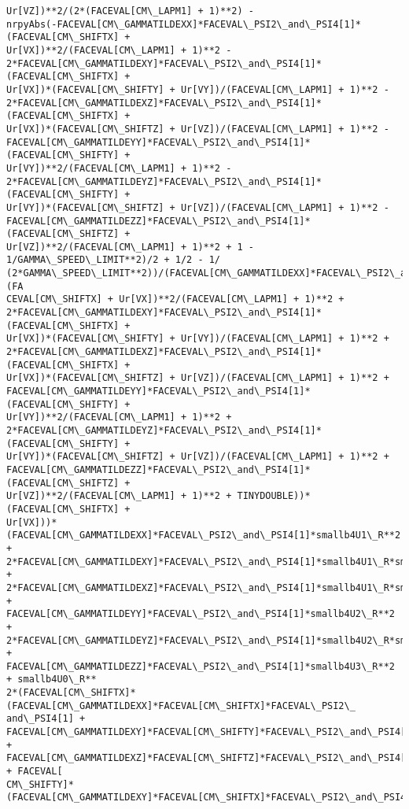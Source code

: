 \documentclass[landscape,letterpaper,10pt,english]{article}
\begin{document}
\begin{Verbatim}[commandchars=\\\{\}]
Ur[VZ])**2/(2*(FACEVAL[CM\_LAPM1] + 1)**2) -
nrpyAbs(-FACEVAL[CM\_GAMMATILDEXX]*FACEVAL\_PSI2\_and\_PSI4[1]*(FACEVAL[CM\_SHIFTX] +
Ur[VX])**2/(FACEVAL[CM\_LAPM1] + 1)**2 -
2*FACEVAL[CM\_GAMMATILDEXY]*FACEVAL\_PSI2\_and\_PSI4[1]*(FACEVAL[CM\_SHIFTX] +
Ur[VX])*(FACEVAL[CM\_SHIFTY] + Ur[VY])/(FACEVAL[CM\_LAPM1] + 1)**2 -
2*FACEVAL[CM\_GAMMATILDEXZ]*FACEVAL\_PSI2\_and\_PSI4[1]*(FACEVAL[CM\_SHIFTX] +
Ur[VX])*(FACEVAL[CM\_SHIFTZ] + Ur[VZ])/(FACEVAL[CM\_LAPM1] + 1)**2 -
FACEVAL[CM\_GAMMATILDEYY]*FACEVAL\_PSI2\_and\_PSI4[1]*(FACEVAL[CM\_SHIFTY] +
Ur[VY])**2/(FACEVAL[CM\_LAPM1] + 1)**2 -
2*FACEVAL[CM\_GAMMATILDEYZ]*FACEVAL\_PSI2\_and\_PSI4[1]*(FACEVAL[CM\_SHIFTY] +
Ur[VY])*(FACEVAL[CM\_SHIFTZ] + Ur[VZ])/(FACEVAL[CM\_LAPM1] + 1)**2 -
FACEVAL[CM\_GAMMATILDEZZ]*FACEVAL\_PSI2\_and\_PSI4[1]*(FACEVAL[CM\_SHIFTZ] +
Ur[VZ])**2/(FACEVAL[CM\_LAPM1] + 1)**2 + 1 - 1/GAMMA\_SPEED\_LIMIT**2)/2 + 1/2 - 1/
(2*GAMMA\_SPEED\_LIMIT**2))/(FACEVAL[CM\_GAMMATILDEXX]*FACEVAL\_PSI2\_and\_PSI4[1]*(FA
CEVAL[CM\_SHIFTX] + Ur[VX])**2/(FACEVAL[CM\_LAPM1] + 1)**2 +
2*FACEVAL[CM\_GAMMATILDEXY]*FACEVAL\_PSI2\_and\_PSI4[1]*(FACEVAL[CM\_SHIFTX] +
Ur[VX])*(FACEVAL[CM\_SHIFTY] + Ur[VY])/(FACEVAL[CM\_LAPM1] + 1)**2 +
2*FACEVAL[CM\_GAMMATILDEXZ]*FACEVAL\_PSI2\_and\_PSI4[1]*(FACEVAL[CM\_SHIFTX] +
Ur[VX])*(FACEVAL[CM\_SHIFTZ] + Ur[VZ])/(FACEVAL[CM\_LAPM1] + 1)**2 +
FACEVAL[CM\_GAMMATILDEYY]*FACEVAL\_PSI2\_and\_PSI4[1]*(FACEVAL[CM\_SHIFTY] +
Ur[VY])**2/(FACEVAL[CM\_LAPM1] + 1)**2 +
2*FACEVAL[CM\_GAMMATILDEYZ]*FACEVAL\_PSI2\_and\_PSI4[1]*(FACEVAL[CM\_SHIFTY] +
Ur[VY])*(FACEVAL[CM\_SHIFTZ] + Ur[VZ])/(FACEVAL[CM\_LAPM1] + 1)**2 +
FACEVAL[CM\_GAMMATILDEZZ]*FACEVAL\_PSI2\_and\_PSI4[1]*(FACEVAL[CM\_SHIFTZ] +
Ur[VZ])**2/(FACEVAL[CM\_LAPM1] + 1)**2 + TINYDOUBLE))*(FACEVAL[CM\_SHIFTX] +
Ur[VX]))*(FACEVAL[CM\_GAMMATILDEXX]*FACEVAL\_PSI2\_and\_PSI4[1]*smallb4U1\_R**2 +
2*FACEVAL[CM\_GAMMATILDEXY]*FACEVAL\_PSI2\_and\_PSI4[1]*smallb4U1\_R*smallb4U2\_R +
2*FACEVAL[CM\_GAMMATILDEXZ]*FACEVAL\_PSI2\_and\_PSI4[1]*smallb4U1\_R*smallb4U3\_R +
FACEVAL[CM\_GAMMATILDEYY]*FACEVAL\_PSI2\_and\_PSI4[1]*smallb4U2\_R**2 +
2*FACEVAL[CM\_GAMMATILDEYZ]*FACEVAL\_PSI2\_and\_PSI4[1]*smallb4U2\_R*smallb4U3\_R +
FACEVAL[CM\_GAMMATILDEZZ]*FACEVAL\_PSI2\_and\_PSI4[1]*smallb4U3\_R**2 + smallb4U0\_R**
2*(FACEVAL[CM\_SHIFTX]*(FACEVAL[CM\_GAMMATILDEXX]*FACEVAL[CM\_SHIFTX]*FACEVAL\_PSI2\_
and\_PSI4[1] +
FACEVAL[CM\_GAMMATILDEXY]*FACEVAL[CM\_SHIFTY]*FACEVAL\_PSI2\_and\_PSI4[1] +
FACEVAL[CM\_GAMMATILDEXZ]*FACEVAL[CM\_SHIFTZ]*FACEVAL\_PSI2\_and\_PSI4[1]) + FACEVAL[
CM\_SHIFTY]*(FACEVAL[CM\_GAMMATILDEXY]*FACEVAL[CM\_SHIFTX]*FACEVAL\_PSI2\_and\_PSI4[1]

\end{Verbatim}
\end{document}
